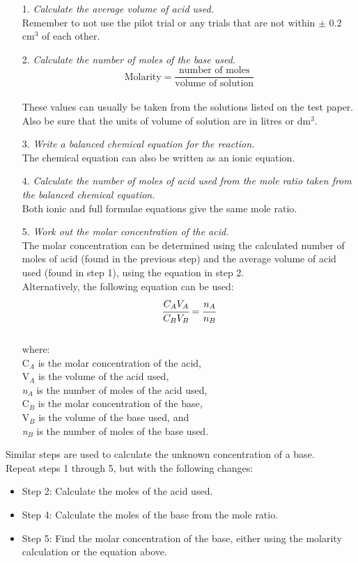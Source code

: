 \begin{enumerate}
\item[1.] \textit{Calculate the average volume of acid used.}\\
Remember to not use the pilot trial or any trials that are not within $\pm$ 0.2 cm$^3$ of each other.
\item[2.] \textit{Calculate the number of moles of the base used.}\\
$$\text{Molarity} = \frac{\text{number of moles}}{\text{volume of solution}}$$\\
These values can usually be taken from the solutions listed on the test paper. Also be sure that the units of volume of solution are in litres or dm$^3$.
\item[3.] \textit{Write a balanced chemical equation for the reaction.}\\
The chemical equation can also be written as an ionic equation.
\item[4.] \textit{Calculate the number of moles of acid used from the mole ratio taken from the balanced chemical equation.}\\
Both ionic and full formulae equations give the same mole ratio.
\item[5.] \textit{Work out the molar concentration of the acid.}\\
The molar concentration can be determined using the calculated number of moles of acid (found in the previous step) and the average volume of acid used (found in step 1), using the equation in step 2.\\
Alternatively, the following equation can be used:\\
$$\cfrac{C_AV_A}{C_BV_B} = \cfrac{n_A}{n_B}$$\\

where:\\
C$_A$ is the molar concentration of the acid,\\
V$_A$ is the volume of the acid used,\\
\textit{n}$_A$ is the number of moles of the acid used,\\
C$_B$ is the molar concentration of the base,\\
V$_B$ is the volume of the base used, and\\
\textit{n}$_B$ is the number of moles of the base used.\\
\end{enumerate}
Similar steps are used to calculate the unknown concentration of a base.\\
Repeat steps 1 through 5, but with the following changes:\\
\begin{itemize}
\item{Step 2: Calculate the moles of the acid used.}
\item{Step 4: Calculate the moles of the base from the mole ratio.}
\item{Step 5: Find the molar concentration of the base, either using the molarity calculation or the equation above.}
\end{itemize}


